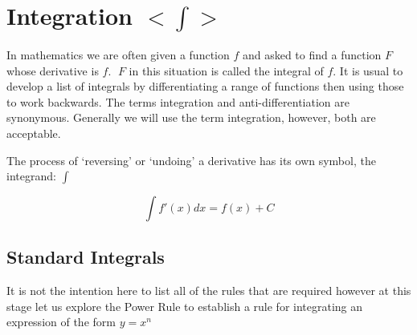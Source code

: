 \chapter[Integration]{Integration $<\int>$}
In mathematics we are often given a function $f$ and asked to find a function $F$ whose derivative is $f$. $\;F$ in this situation is called the integral of $f$. It is usual to develop a list of integrals by differentiating a range of functions then using those to work backwards. The terms integration and anti-differentiation are synonymous. Generally we will use the term integration, however, both are acceptable.

The process of `reversing' or `undoing' a derivative has its own symbol, the integrand: $\displaystyle\int$
\begin{tcolorbox}
	\[\int f'(x) dx = f(x)+C\]
\end{tcolorbox}

\section{Standard Integrals}
It is not the intention here to list all of the rules that are required however at this stage let us explore the Power Rule to establish a rule for integrating an expression of the form $y =x^{n}$ \\


